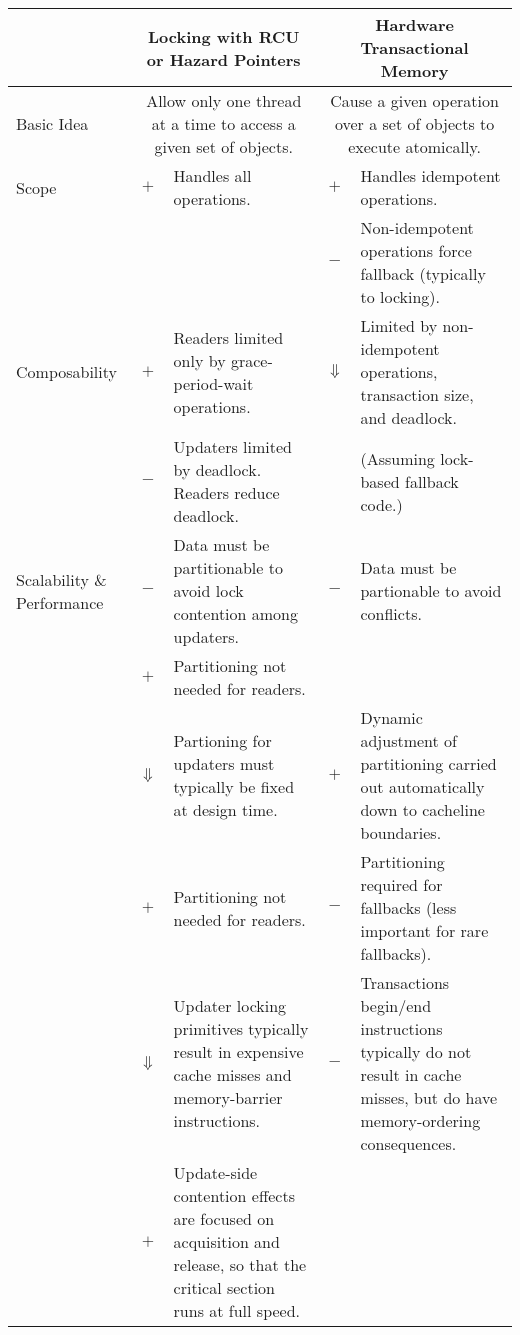 
\begin{table*}[p]
\begin{center}
\small
\raggedright
\begin{tabular}{p{1.0in}||c|p{2.0in}||c|p{2.0in}}
& \multicolumn{2}{c||}{Locking with RCU or Hazard Pointers} & \multicolumn{2}{c}{Hardware Transactional Memory} \\
\hline
\hline
Basic Idea
	& \multicolumn{2}{p{2.2in}||}{
	  Allow only one thread at a time to access a given set of objects.}
		& \multicolumn{2}{p{2.2in}}{
		  Cause a given operation over a set of objects to execute
		  atomically.} \\
\hline
\hline
Scope
	& $+$
	& Handles all operations.
		& $+$
		& Handles idempotent operations. \\
\cline{4-5}
	& &
		& $-$
		& Non-idempotent operations force fallback (typically
		  to locking). \\
\hline
Composability
	& $+$
	& Readers limited only by grace-period-wait operations.
		& $\Downarrow$
		& Limited by non-idempotent operations, transaction size,
		  and deadlock. \\
\cline{2-3}
	& $-$
	& Updaters limited by deadlock.  Readers reduce deadlock.
		&
		& (Assuming lock-based fallback code.) \\
\hline
Scalability \& Performance
	& $-$
	& Data must be partitionable to avoid lock contention among
	  updaters.
		& $-$
		& Data must be partionable to avoid conflicts. \\
\cline{2-3}
	& $+$
	& Partitioning not needed for readers.
		&
		& \\
\cline{2-5}
	& $\Downarrow$
	& Partioning for updaters must typically be fixed at design time.
		& $+$
		& Dynamic adjustment of partitioning carried out
		  automatically down to cacheline boundaries. \\
\cline{2-5}
	& $+$
	& Partitioning not needed for readers.
		& $-$
		& Partitioning required for fallbacks (less important
		  for rare fallbacks). \\
\cline{2-5}
	& $\Downarrow$
	& Updater locking primitives typically result in expensive cache
	  misses and memory-barrier instructions.
		& $-$
		& Transactions begin/end instructions typically do not
		  result in cache misses, but do have memory-ordering
		  consequences. \\
\cline{2-5}
	& $+$
	& Update-side contention effects are focused on acquisition and
	  release, so that the critical section runs at full speed.

\end{tabular}
\end{center}
\end{table*}
